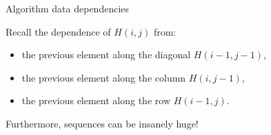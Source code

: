      \begin{frame}{Algorithm data dependencies}


        Recall the dependence of $H(i, j)$ from:
        \begin{itemize}
            \item the previous element along the diagonal $H(i-1, j-1)$,
            \item the previous element along the column $H(i, j-1)$,
            \item the previous element along the row $H(i-1, j)$.
        \end{itemize}

        \vspace{10pt}

        Furthermore, sequences can be insanely huge!

    \end{frame}